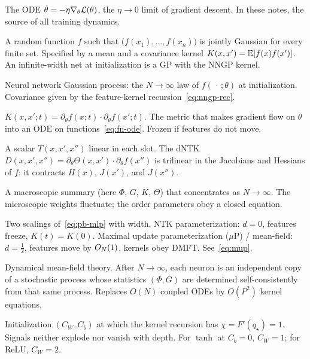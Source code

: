 \begin{description}[style=nextline,leftmargin=1.1em,itemsep=0.55em,font=\normalfont\bfseries]
\item[Gradient flow.]
The ODE $\dot\theta=-\eta\nabla_\theta\mathcal{L}(\theta)$, the $\eta\to 0$ limit of gradient descent. In these notes, the source of all training dynamics.

\item[Gaussian process.]
A random function $f$ such that $\bigl(f(x_1),\ldots,f(x_n)\bigr)$ is jointly Gaussian for every finite set. Specified by a mean and a covariance kernel $K(x,x')=\mathbb{E}[f(x)f(x')]$. An infinite-width net at initialization is a GP with the NNGP kernel.

\item[NNGP.]
Neural network Gaussian process: the $N\to\infty$ law of $f(\,\cdot\,;\theta)$ at initialization. Covariance given by the feature-kernel recursion~\eqref{eq:nngp-rec}.

\item[Neural tangent kernel.]
$K(x,x';t)=\partial_\theta f(x;t)\cdot\partial_\theta f(x';t)$. The metric that makes gradient flow on $\theta$ into an ODE on functions~\eqref{eq:fn-ode}. Frozen if features do not move.

\item[Trilinear kernel.]
A scalar $T(x,x',x'')$ linear in each slot. The dNTK $D(x,x',x'')=\partial_\theta\Theta(x,x')\cdot\partial_\theta f(x'')$ is trilinear in the Jacobians and Hessians of $f$: it contracts $H(x)$, $J(x')$, and $J(x'')$.

\item[Order parameter.]
A macroscopic summary (here $\Phi$, $G$, $K$, $\Theta$) that concentrates as $N\to\infty$. The microscopic weights fluctuate; the order parameters obey a closed equation.

\item[NTK parameterization / $\mu$P.]
Two scalings of~\eqref{eq:pb-mlp} with width. NTK parameterization: $d=0$, features freeze, $K(t)=K(0)$. Maximal update parameterization ($\mu$P) / mean-field: $d=\tfrac12$, features move by $O_{N}(1)$, kernels obey DMFT. See~\eqref{eq:mup}.

\item[DMFT.]
Dynamical mean-field theory. After $N\to\infty$, each neuron is an independent copy of a stochastic process whose statistics $(\Phi,G)$ are determined self-consistently from that same process. Replaces $O(N)$ coupled ODEs by $O(P^2)$ kernel equations.

\item[Criticality.]
Initialization $(C_W,C_b)$ at which the kernel recursion has $\chi=F'(q_\star)=1$. Signals neither explode nor vanish with depth. For $\tanh$ at $C_b=0$, $C_W=1$; for ReLU, $C_W=2$.


\end{description}
